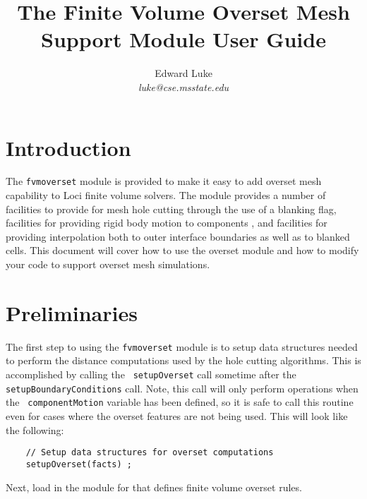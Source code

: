 \documentclass{article}
\begin{document}
\title{The Finite Volume Overset Mesh Support Module User Guide}

\author{ Edward Luke \\
\it luke@cse.msstate.edu}

\maketitle


\section{Introduction}

The {\tt fvmoverset} module is provided to make it easy to add overset
mesh capability to Loci finite volume solvers.  The module provides a
number of facilities to provide for mesh hole cutting through the use
of a blanking flag, facilities for providing rigid body motion to
components , and facilities for providing interpolation both to outer
interface boundaries as well as to blanked cells.  This document will
cover how to use the overset module and how to modify your code to
support overset mesh simulations.

\section{Preliminaries}

The first step to using the {\tt fvmoverset} module is to setup data
structures needed to perform the distance computations used by the
hole cutting algorithms.  This is accomplished by calling the {\tt
  setupOverset} call sometime after the {\tt setupBoundaryConditions}
call.  Note, this call will only perform operations when the {\tt
  componentMotion} variable has been defined, so it is safe to call
this routine even for cases where the overset features are not being
used.  This will look like the following:

\begin{verbatim}
    // Setup data structures for overset computations
    setupOverset(facts) ;
\end{verbatim}


Next, load in the module for that defines finite volume overset rules.
\end{document}
